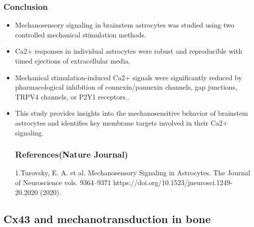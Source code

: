 \documentclass{article}
\begin{document}
\subsubsection{Conclusion}
\begin{itemize}
\item Mechanosensory signaling in brainstem astrocytes was studied using two controlled mechanical stimulation methods.
\item Ca2+ responses in individual astrocytes were robust and reproducible with timed ejections of extracellular media.
\item Mechanical stimulation-induced Ca2+ signals were significantly reduced by pharmacological inhibition of connexin/pannexin channels, gap junctions, TRPV4 channels, or P2Y1 receptors..
\item This study provides insights into the mechanosensitive behavior of brainstem astrocytes and identifies key membrane targets involved in their Ca2+ signaling.
\subsubsection{References(Nature Journal)}
1.Turovsky, E. A. et al. Mechanosensory Signaling in Astrocytes. The Journal of Neuroscience vols. 9364–9371 https://doi.org/10.1523/jneurosci.1249-20.2020 (2020).
\newpage
\end{itemize}
\subsection{Cx43 and mechanotransduction in bone}
\end{document}
